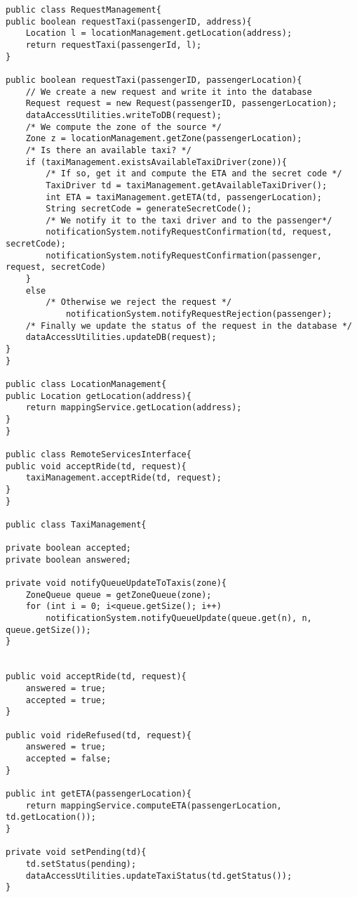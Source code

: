 \begin{lstlisting}
public class RequestManagement{ 
public boolean requestTaxi(passengerID, address){
	Location l = locationManagement.getLocation(address);
	return requestTaxi(passengerId, l);
}

public boolean requestTaxi(passengerID, passengerLocation){
	// We create a new request and write it into the database 
	Request request = new Request(passengerID, passengerLocation);
	dataAccessUtilities.writeToDB(request);
	/* We compute the zone of the source */
	Zone z = locationManagement.getZone(passengerLocation);
	/* Is there an available taxi? */
	if (taxiManagement.existsAvailableTaxiDriver(zone)){
		/* If so, get it and compute the ETA and the secret code */
		TaxiDriver td = taxiManagement.getAvailableTaxiDriver();
		int ETA = taxiManagement.getETA(td, passengerLocation);
		String secretCode = generateSecretCode();
		/* We notify it to the taxi driver and to the passenger*/
		notificationSystem.notifyRequestConfirmation(td, request, secretCode);
		notificationSystem.notifyRequestConfirmation(passenger, request, secretCode)
	}
	else
		/* Otherwise we reject the request */
			notificationSystem.notifyRequestRejection(passenger);
	/* Finally we update the status of the request in the database */
	dataAccessUtilities.updateDB(request);	
}
}

public class LocationManagement{
public Location getLocation(address){
	return mappingService.getLocation(address);
}
}

public class RemoteServicesInterface{
public void acceptRide(td, request){
	taxiManagement.acceptRide(td, request);
}
}

public class TaxiManagement{

private boolean accepted;
private boolean answered;

private void notifyQueueUpdateToTaxis(zone){
	ZoneQueue queue = getZoneQueue(zone);
	for (int i = 0; i<queue.getSize(); i++)
		notificationSystem.notifyQueueUpdate(queue.get(n), n, queue.getSize());
}


public void acceptRide(td, request){
	answered = true;
	accepted = true;
}

public void rideRefused(td, request){
	answered = true;
	accepted = false;
}

public int getETA(passengerLocation){
	return mappingService.computeETA(passengerLocation, td.getLocation());
}

private void setPending(td){
	td.setStatus(pending);
	dataAccessUtilities.updateTaxiStatus(td.getStatus());
}


\end{lstlisting}
